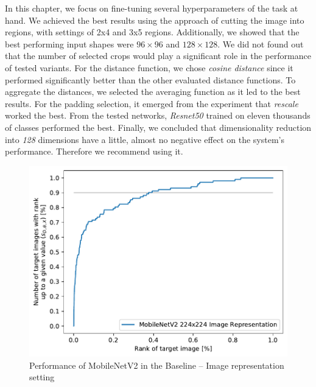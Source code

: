 In this chapter, we focus on fine-tuning several hyperparameters of the task at hand. We achieved the best results using the approach of cutting the image into regions, with settings of 2x4 and 3x5 regions. Additionally, we showed that the best performing input shapes were $96\times 96$ and $128 \times 128$.  We did not found out that the number of selected crops would play a significant role in the performance of tested variants. For the distance function, we chose \emph{cosine distance} since it performed significantly better than the other evaluated distance functions. To aggregate the distances, we selected the averaging function as it led to the best results. For the padding selection, it emerged from the experiment that \emph{rescale} worked the best. From the tested networks, \emph{Resnet50} trained on eleven thousands of classes performed the best. Finally, we concluded that dimensionality reduction into \emph{128} dimensions have a little, almost no negative effect on the system's performance. Therefore we recommend using it. 



\begin{figure}
    \centering
    \includegraphics[width=0.8\linewidth]{graphs/dd20090d2f746141e927422ef0528eed6141a2d1478d86afe3d450e0c99e9765.pdf}
    \caption{Performance of MobileNetV2 in the Baseline -- Image representation setting}
    \label{fig:mobilenet_whole_image_example}
\end{figure}

